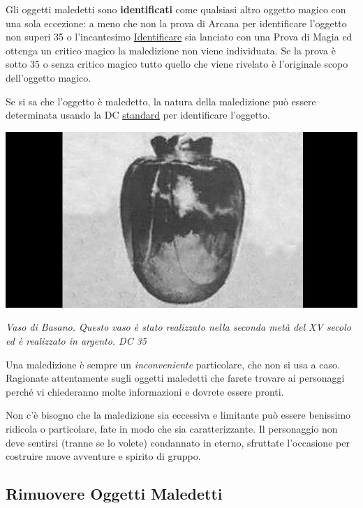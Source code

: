\begin{multicols}{2}
\medskip

Gli oggetti maledetti sono \hypertarget{oggettimaledettiid}{\textbf{identificati}}\label{oggettimaledettiid} come qualsiasi altro oggetto magico con una sola eccezione: a meno che non la prova di Arcana per identificare l'oggetto non superi 35 o l'incantesimo \hyperlink{Identificare}{Identificare} sia lanciato con una Prova di Magia ed ottenga un critico magico la maledizione non viene individuata. Se la prova è sotto 35 o senza critico magico tutto quello che viene rivelato è l'originale scopo dell'oggetto magico.

Se si sa che l'oggetto è maledetto, la natura della maledizione può essere determinata usando la DC \hyperlink{identificareom}{standard} per identificare l'oggetto.

\begin{center}
\includegraphics[width=0.75\linewidth]{immagini/vasobasano.png}

\emph{Vaso di Basano. Questo vaso è stato realizzato nella seconda metà del XV secolo ed è realizzato in argento. DC 35}
\end{center}


\begin{changemargin}{0.3cm}{0.3cm}\begin{narratore}
Una maledizione è sempre un \emph{inconveniente} particolare, che non si usa a caso. Ragionate attentamente sugli oggetti maledetti che farete trovare ai personaggi perché vi chiederanno molte informazioni e dovrete essere pronti.

Non c'è bisogno che la maledizione sia eccessiva e limitante può essere benissimo ridicola o particolare, fate in modo che sia caratterizzante. Il personaggio non deve sentirsi (tranne se lo volete) condannato in eterno, sfruttate l'occasione per costruire nuove avventure e spirito di gruppo.
\end{narratore}\end{changemargin}

\subsection{Rimuovere Oggetti Maledetti}


\end{multicols}
